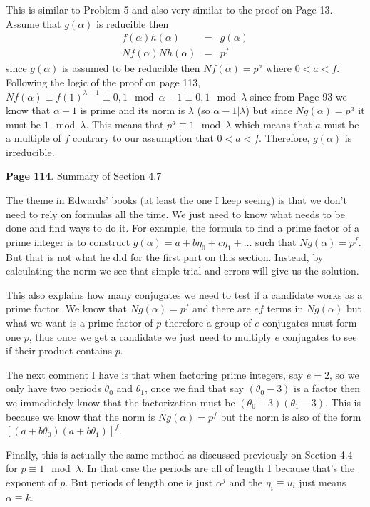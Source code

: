 \documentclass[aps,preprint,preprintnumbers,nofootinbib,showpacs,prd]{revtex4-1}
\newcommand{\nbea}{\begin{eqnarray*}}
\newcommand{\neea}{\end{eqnarray*}}
\begin{document}
This is similar to Problem 5 and also very similar to the proof on Page 13. Assume that $g(\alpha)$ is reducible then
%
\nbea
f(\alpha) h(\alpha) & = & g(\alpha) \\
Nf(\alpha) Nh(\alpha) & = & p^f
\neea
%
since $g(\alpha)$ is assumed to be reducible then $Nf(\alpha) = p^a$ where $0 < a < f$. Following the logic of the proof on page 113, $Nf(\alpha) \equiv f(1)^{\lambda-1} \equiv 0,1 \mod{\alpha - 1} \equiv 0,1 \mod{\lambda}$ since from Page 93 we know that $\alpha - 1$ is prime and its norm is $\lambda$ (so $\alpha - 1|\lambda$) but since $Ng(\alpha) = p^a$ it must be $1 \mod{\lambda}$. This means that $p^a \equiv 1 \mod{\lambda}$ which means that $a$ must be a multiple of $f$ contrary to our assumption that $0 < a < f$. Therefore, $g(\alpha)$ is irreducible.

{\bf Page 114}. Summary of Section 4.7

The theme in Edwards' books (at least the one I keep seeing) is that we don't need to rely on formulas all the time. We just need to know what needs to be done and find ways to do it. For example, the formula to find a prime factor of a prime integer is to construct $g(\alpha) = a + b\eta_0 + c\eta_1 + \dots$ such that $Ng(\alpha) = p^f$. But that is not what he did for the first part on this section. Instead, by calculating the norm we see that simple trial and errors will give us the solution.

This also explains how many conjugates we need to test if a candidate works as a prime factor. We know that $Ng(\alpha) = p^f$ and there are $ef$ terms in $Ng(\alpha)$ but what we want is a prime factor of $p$ therefore a group of $e$ conjugates must form one $p$, thus once we get a candidate we just need to multiply $e$ conjugates to see if their product contains $p$.

The next comment I have is that when factoring prime integers, say $e = 2$, so we only have two periods $\theta_0$ and $\theta_1$, once we find that say $(\theta_0 - 3)$ is a factor then we immediately know that the factorization must be $(\theta_0 - 3)(\theta_1 - 3)$. This is because we know that the norm is $Ng(\alpha) = p^f$ but the norm is also of the form $[(a + b\theta_0)(a + b\theta_1)]^f$.

Finally, this is actually the same method as discussed previously on Section 4.4 for $p \equiv 1 \mod{\lambda}$. In that case the periods are all of length 1 because that's the exponent of $p$. But periods of length one is just $\alpha^j$ and the $\eta_i \equiv u_i$ just means $\alpha \equiv k$.
\end{document}
